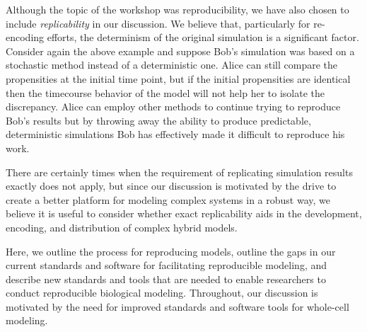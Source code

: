 \documentclass[journal,transmag,twoside]{IEEEtran}
\begin{document}

Although the topic of the workshop was reproducibility, we have also chosen to include \textit{replicability} in our discussion. We believe that, particularly for re-encoding efforts, the determinism of the original simulation is a significant factor. Consider again the above example and suppose Bob's simulation was based on a stochastic method instead of a deterministic one. Alice can still compare the propensities at the initial time point, but if the initial propensities are identical then the timecourse behavior of the model will not help her to isolate the discrepancy. Alice can employ other methods to continue trying to reproduce Bob's results but by throwing away the ability to produce predictable, deterministic simulations Bob has effectively made it difficult to reproduce his work.

There are certainly times when the requirement of replicating simulation results exactly does not apply, but since our discussion is motivated by the drive to create a better platform for modeling complex systems in a robust way, we believe it is useful to consider whether exact replicability aids in the development, encoding, and distribution of complex hybrid models.


Here, we outline the process for reproducing models, outline the gaps in our current standards and software for facilitating 
reproducible modeling, and describe new standards and tools that are needed to enable researchers to conduct reproducible
biological modeling. Throughout, our discussion is motivated by the need for improved standards and software tools for whole-cell modeling.
\end{document}
